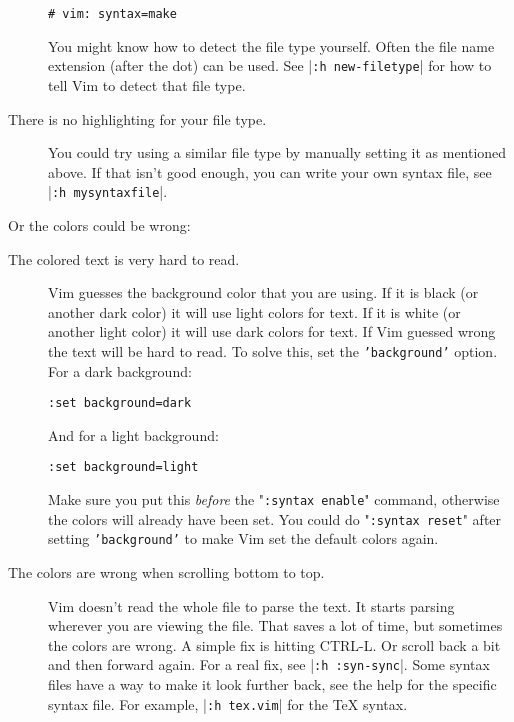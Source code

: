 \begin{description}
								\begin{Verbatim}[samepage=true]
		 # vim: syntax=make

								\end{Verbatim}

								You might know how to detect the file type yourself.
								Often the file name extension (after the dot) can be used.
								See |\texttt{:h new-filetype}| for how to tell Vim to detect that file type.

				\item [There is no highlighting for your file type.]
								You could try using a similar file type by manually setting it as mentioned above.
								If that isn't good enough, you can write your own syntax file, see |\texttt{:h mysyntaxfile}|.
\end{description}

Or the colors could be wrong:

\begin{description}
				\item [The colored text is very hard to read.]
								Vim guesses the background color that you are using.  If it is black
								(or another dark color) it will use light colors for text.  If it is
								white (or another light color) it will use dark colors for text.  If
								Vim guessed wrong the text will be hard to read.  To solve this, set
								the \texttt{'background'} option.  For a dark background:

								\begin{Verbatim}[samepage=true]
		 :set background=dark
												\end{Verbatim}

								And for a light background:

								\begin{Verbatim}[samepage=true]
		 :set background=light
												\end{Verbatim}

								Make sure you put this \emph{before} the "\texttt{:syntax enable}" command, otherwise the colors will already have been set.
								You could do "\texttt{:syntax reset}" after setting \texttt{'background'} to make Vim set the default colors again.

				\item [The colors are wrong when scrolling bottom to top.]
								Vim doesn't read the whole file to parse the text.
								It starts parsing wherever you are viewing the file.
								That saves a lot of time, but sometimes the colors are wrong.
								A simple fix is hitting CTRL-L.
								Or scroll back a bit and then forward again.
								For a real fix, see |\texttt{:h :syn-sync}|.
								Some syntax files have a way to make it look further back, see the help for the specific syntax file.
								For example, |\texttt{:h tex.vim}| for the TeX syntax.
\end{description}

